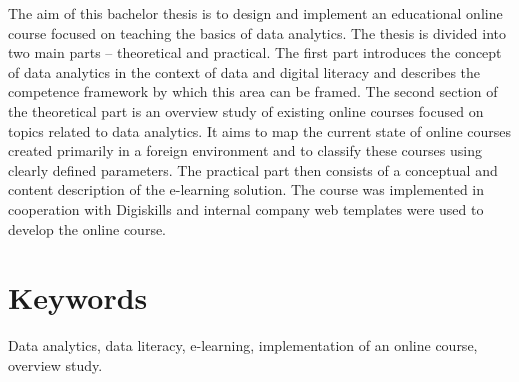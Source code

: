 \documentclass[a4paper,12pt,openany,twoside]{book} %
\begin{document}
The aim of this bachelor thesis is to design and implement an educational online course focused on teaching the basics of data analytics. The thesis is divided into two main parts – theoretical and practical. The first part introduces the concept of data analytics in the context of data and digital literacy and describes the competence framework by which this area can be framed. The second section of the theoretical part is an overview study of existing online courses focused on topics related to data analytics. It aims to map the current state of online courses created primarily in a foreign environment and to classify these courses using clearly defined parameters. The practical part then consists of a conceptual and content description of the e-learning solution. The course was implemented in cooperation with Digiskills and internal company web templates were used to develop the online course.

\section*{Keywords}

Data analytics, data literacy, e-learning, implementation of an online course, overview study.

\clearpage

\tableofcontents

\cleardoublepage
{}





\clearpage

\pagestyle{plain}

\begin{spacing}{1.05}
\printbibliography[title={Seznam použitých zdrojů}]
\end{spacing}
\end{document}
